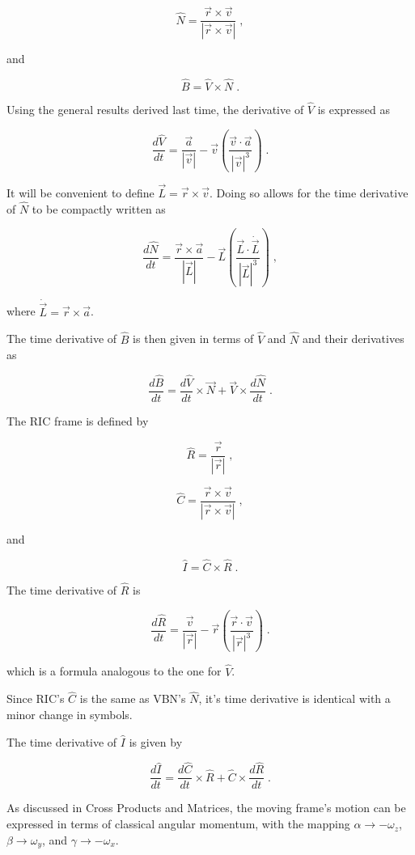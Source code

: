 \documentclass[10pt]{article}
\begin{document}
\[ \hat N = \frac{ \vec r \times \vec v }{ | \vec r \times \vec v | } \;, \]

and

\[ \hat B = \hat V \times \hat N \; .\]

Using the general results derived last time, the derivative of $\hat V$ is expressed as 

\[ \frac{d \hat V}{dt}  = \frac{\vec a}{|\vec v|} - \vec v \left( \frac{\vec v \cdot \vec a}{|\vec v|^3} \right) \; .\]

It will be convenient to define $\vec L = \vec r \times \vec v$.  Doing so allows for the time derivative of $\hat N$ to be compactly written as

\[ \frac{d \hat N}{dt} = \frac{\vec r \times \vec a}{|\vec L|} - \vec L \left( \frac{\vec L \cdot \dot{\vec L}}{|\vec L|^3} \right) \; ,\]

where $\dot{\vec L} = \vec r \times \vec a$.

The time derivative of $\hat B$ is then given in terms of $\hat V$ and $\hat N$ and their derivatives as 

\[ \frac{d \hat B}{d t} = \frac{d \hat V}{d t} \times \vec N + \vec V \times \frac{d \hat N}{d t} \; .\]

The RIC frame is defined by 

\[ \hat R = \frac{\vec r}{|\vec r|} \; ,\]

\[ \hat C =  \frac{ \vec r \times \vec v }{ | \vec r \times \vec v | } \; ,\]

and 

\[ \hat I = \hat C \times \hat R \; .\]

The time derivative of $\hat R$ is 

\[ \frac{d \hat R}{dt}  = \frac{\vec v}{|\vec r|} - \vec r \left( \frac{\vec r \cdot \vec v}{|\vec r|^3} \right) \; .\]

which is a formula analogous to the one for $\hat V$. 

Since RIC's $\hat C$ is the same as VBN's $\hat N$, it's time derivative is identical with a minor change in symbols.

The time derivative of $\hat I$ is given by 

\[ \frac{d \hat I}{d t} = \frac{d \hat C}{dt} \times \hat R + \hat C \times \frac{d \hat R}{dt} \; .\]

As discussed in Cross Products and Matrices, the moving frame's motion can be expressed in terms of classical angular momentum, with the mapping $\alpha \rightarrow -\omega_z$, $\beta \rightarrow \omega_y$, and $\gamma \rightarrow - \omega_x$.  
\end{document}
